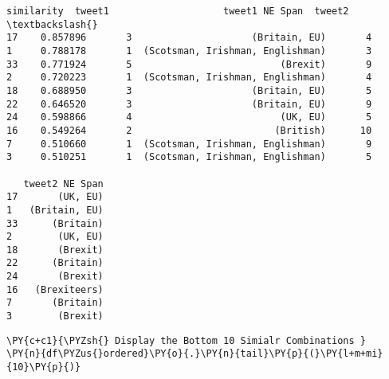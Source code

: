             \begin{tcolorbox}[breakable, size=fbox, boxrule=.5pt, pad at break*=1mm, opacityfill=0]
\begin{Verbatim}[commandchars=\\\{\}]
    similarity  tweet1                    tweet1 NE Span  tweet2  \textbackslash{}
17    0.857896       3                     (Britain, EU)       4
1     0.788178       1  (Scotsman, Irishman, Englishman)       3
33    0.771924       5                          (Brexit)       9
2     0.720223       1  (Scotsman, Irishman, Englishman)       4
18    0.688950       3                     (Britain, EU)       5
22    0.646520       3                     (Britain, EU)       9
24    0.598866       4                          (UK, EU)       5
16    0.549264       2                         (British)      10
7     0.510660       1  (Scotsman, Irishman, Englishman)       9
3     0.510251       1  (Scotsman, Irishman, Englishman)       5

   tweet2 NE Span
17       (UK, EU)
1   (Britain, EU)
33      (Britain)
2        (UK, EU)
18       (Brexit)
22      (Britain)
24       (Brexit)
16   (Brexiteers)
7       (Britain)
3        (Brexit)
\end{Verbatim}
\end{tcolorbox}
        
    \begin{tcolorbox}[breakable, size=fbox, boxrule=1pt, pad at break*=1mm,colback=cellbackground, colframe=cellborder]
\begin{Verbatim}[commandchars=\\\{\}]
\PY{c+c1}{\PYZsh{} Display the Bottom 10 Simialr Combinations }
\PY{n}{df\PYZus{}ordered}\PY{o}{.}\PY{n}{tail}\PY{p}{(}\PY{l+m+mi}{10}\PY{p}{)}
\end{Verbatim}
\end{tcolorbox}

